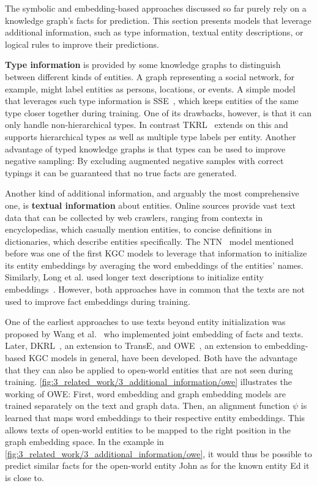 The symbolic and embedding-based approaches discussed so far purely rely on a knowledge graph's facts for prediction. This section presents models that leverage additional information, such as type information, textual entity descriptions, or logical rules to improve their predictions.

\textbf{Type information} is provided by some knowledge graphs to distinguish between different kinds of entities. A graph representing a social network, for example, might label entities as persons, locations, or events. A simple model that leverages such type information is SSE~\cite{Guo2015SemanticallySK}, which keeps entities of the same type closer together during training. One of its drawbacks, however, is that it can only handle non-hierarchical types. In contrast TKRL~\cite{Xie2016RepresentationLO} extends on this and supports hierarchical types as well as multiple type labels per entity. Another advantage of typed knowledge graphs is that types can be used to improve negative sampling: By excluding augmented negative samples with correct typings it can be guaranteed that no true facts are generated.

Another kind of additional information, and arguably the most comprehensive one, is \textbf{textual information} about entities. Online sources provide vast text data that can be collected by web crawlers, ranging from contexts in encyclopedias, which casually mention entities, to concise definitions in dictionaries, which describe entities specifically. The NTN~\cite{Socher2013ReasoningWN} model mentioned before was one of the first KGC models to leverage that information to initialize its entity embeddings by averaging the word embeddings of the entities' names. Similarly, Long et al. used longer text descriptions to initialize entity embeddings~\cite{Long2016LeveragingLR}. However, both approaches have in common that the texts are not used to improve fact embeddings during training.

One of the earliest approaches to use texts beyond entity initialization was proposed by Wang et al.~\cite{Wang2014KnowledgeGE} who implemented joint embedding of facts and texts. Later, DKRL~\cite{Xie2016RepresentationLO}, an extension to TransE, and OWE~\cite{Shah2019AnOE}, an extension to embedding-based KGC models in general, have been developed. Both have the advantage that they can also be applied to open-world entities that are not seen during training. \autoref{fig:3_related_work/3_additional_information/owe} illustrates the working of OWE: First, word embedding and graph embedding models are trained separately on the text and graph data. Then, an alignment function $\psi$ is learned that maps word embeddings to their respective entity embeddings. This allows texts of open-world entities to be mapped to the right position in the graph embedding space. In the example in \autoref{fig:3_related_work/3_additional_information/owe}, it would thus be possible to predict similar facts for the open-world entity John as for the known entity Ed it is close to.

